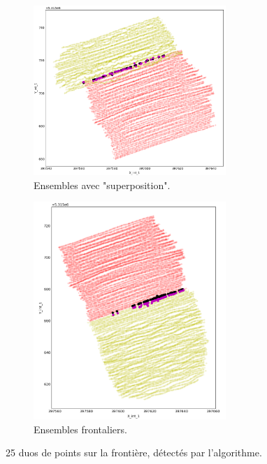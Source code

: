 \documentclass[12pt]{article}
\begin{document}
    \begin{figure}[ht!]
        \centering
        \begin{subfigure}[b]{0.557\textwidth}
            \centering
            \includegraphics[width=0.8\textwidth]{Images/Frontiere_pts1-3.png}
            \caption[]%
            {{ \small Ensembles avec "superposition".}}    
        \end{subfigure}
        \hfill
        \begin{subfigure}[b]{0.418\textwidth}  
            \centering 
            \includegraphics[width=0.8\textwidth]{Images/Frontiere_pts1-2.png}
            \caption[]%
            {{\small Ensembles frontaliers.}}    
        \end{subfigure}
        \caption{\label{fig:2_f}25 duos de points sur la frontière, détectés par l'algorithme.}
    \end{figure}
    
\end{document}
